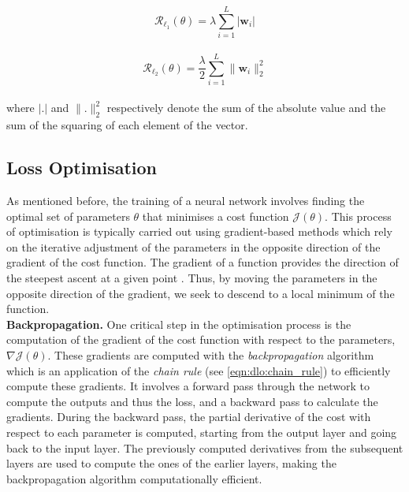 \begin{equation}
  \label{eqn:dlo:reg_l1}
  \mathcal{R}_{\ell_1}(\theta) = \lambda \sum_{i=1}^{L} \left| \mathbf{w}_i \right|
\end{equation}\\

\begin{equation}
  \label{eqn:dlo:reg_l2}
  \mathcal{R}_{\ell_2}(\theta) = \frac{\lambda}{2} \displaystyle \sum_{i=1}^{L} \| \mathbf{w}_i \|_2^2 
\end{equation}\\

\noindent where $\left|. \right|$ and $\|.\|_2^2$ respectively denote the sum of
the absolute value and the sum of the squaring of each element of the vector.\\

\subsection{Loss Optimisation}\label{sec:dlo:backpropagation}

As mentioned before, the training of a neural network involves finding the
optimal set of parameters $\theta$ that minimises a cost function
$\mathcal{J}(\theta)$. This process of optimisation is typically carried out
using gradient-based methods which rely on the iterative adjustment of the
parameters in the opposite direction of the gradient of the cost function. The
gradient of a function provides the direction of the steepest ascent at a given
point \cite{boyd2004convex}. Thus, by moving the parameters in the opposite
direction of the gradient, we seek to descend to a local minimum of the
function.\\

\noindent \textbf{Backpropagation.} One critical step in the optimisation
process is the computation of the gradient of the cost function with respect to
the parameters, $\nabla \mathcal{J}(\theta)$. These gradients are computed with
the \emph{backpropagation} algorithm \cite{rumelhart1986learning} which is an
application of the \emph{chain rule} (see \cref{eqn:dlo:chain_rule}) to
efficiently compute these gradients. It involves a forward pass through the
network to compute the outputs and thus the loss, and a backward pass to
calculate the gradients. During the backward pass, the partial derivative of the
cost with respect to each parameter is computed, starting from the output layer
and going back to the input layer. The previously computed derivatives from the
subsequent layers are used to compute the ones of the earlier layers,  
making the backpropagation algorithm computationally efficient.\\

